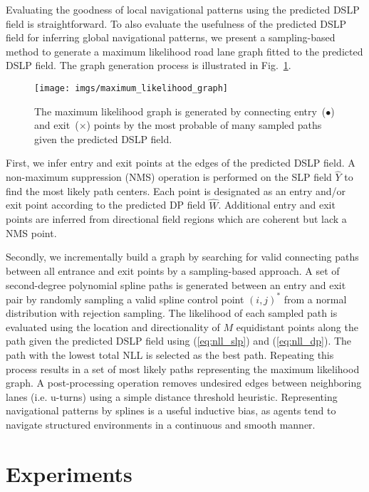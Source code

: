 \documentclass[letterpaper, 10 pt, conference]{ieeeconf}
\begin{document}
Evaluating the goodness of local navigational patterns using the predicted DSLP field is straightforward. To also evaluate the usefulness of the predicted DSLP field for inferring global navigational patterns, we present a sampling-based method to generate a maximum likelihood road lane graph fitted to the predicted DSLP field. The graph generation process is illustrated in Fig.~\ref{fig:maximum_likelihood_graph}.

\begin{figure}\centering
\texttt{[image: imgs/maximum\_likelihood\_graph]}
\vspace{-9mm}
\caption{The maximum likelihood graph is generated by connecting entry~($\bullet$) and exit~($\times$) points by the most probable of many sampled paths given the predicted DSLP field.}
\label{fig:maximum_likelihood_graph}
\vspace{-6mm}
\end{figure}

First, we infer entry and exit points at the edges of the predicted DSLP field. A non-maximum suppression (NMS) operation is performed on the SLP field $\hat{Y}$ to find the most likely path centers. Each point is designated as an entry and/or exit point according to the predicted DP field $\hat{W}$. Additional entry and exit points are inferred from directional field regions which are coherent but lack a NMS point.

Secondly, we incrementally build a graph by searching for valid connecting paths between all entrance and exit points by a sampling-based approach. A set of second-degree polynomial spline paths is generated between an entry and exit pair by randomly sampling a valid spline control point $(i,j)^*$ from a normal distribution with rejection sampling.
The likelihood of each sampled path is evaluated using the location and directionality of $M$ equidistant points along the path given the predicted DSLP field using (\ref{eq:nll_slp}) and (\ref{eq:nll_dp}). The path with the lowest total NLL is selected as the best path. Repeating this process results in a set of most likely paths representing the maximum likelihood graph. A post-processing operation removes undesired edges between neighboring lanes (i.e. u-turns) using a simple distance threshold heuristic.
Representing navigational patterns by splines is a useful inductive bias, as agents tend to navigate structured environments in a continuous and smooth manner.

\section{Experiments}
\end{document}
